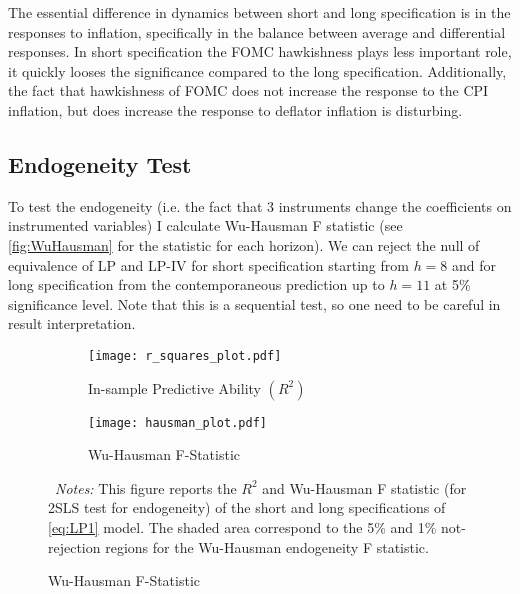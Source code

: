 \documentclass[11pt]{article}
\begin{document}
  The essential difference in dynamics between short and long specification is in the responses to inflation, specifically in the balance between average and differential responses. 
  In short specification the FOMC hawkishness plays less important role, it quickly looses the significance compared to the long specification. 
  Additionally, the fact that hawkishness of FOMC does not increase the response to the CPI inflation, but does increase the response to deflator inflation is disturbing.




\subsection{Endogeneity Test}


To test the endogeneity (i.e. the fact that 3 instruments change the coefficients on instrumented variables) I calculate Wu-Hausman F statistic (see \vref{fig:WuHausman} for the statistic for each horizon). 
We can reject the null of equivalence of LP and LP-IV for short specification starting from $h=8$ and for long specification from the contemporaneous prediction up to $h=11$ at 5\% significance level. 
Note that this is a sequential test, so one need to be careful in result interpretation.



\begin{figure}[!htbp]\centering 
  \begin{minipage}{1\textwidth}\centering
    \caption{Additional Statistics for LP Models}
    \vspace{1ex}
    \begin{subfigure}[b]{0.495\textwidth}
      \caption{In-sample Predictive Ability $\left(R^2\right)$}
    \label{fig:r_square}
  \texttt{[image: r\_squares\_plot.pdf]}
    \end{subfigure}\hfill
    \begin{subfigure}[b]{0.495\textwidth}
      \caption{Wu-Hausman F-Statistic }
    \label{fig:WuHausman}
  \texttt{[image: hausman\_plot.pdf]}
    \end{subfigure}
  {\begin{flushleft}\scriptsize~\textit{Notes:} This figure reports the $R^2$ and Wu-Hausman F statistic (for 2SLS test for endogeneity) of the short and long specifications of \vref{eq:LP1} model. The shaded area correspond to the 5\% and 1\% not-rejection regions for the Wu-Hausman endogeneity F statistic. \end{flushleft}}
  \end{minipage}
\end{figure}
\end{document}
